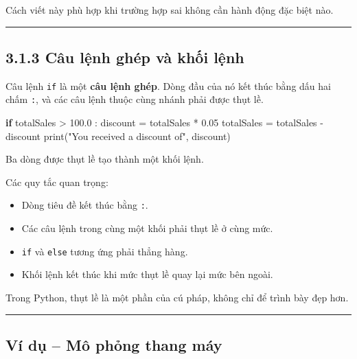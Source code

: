 \documentclass[
  11pt,
  a4paper,
]{article}
\newenvironment{Shaded}{}{}
\newcommand{\BuiltInTok}[1]{\textcolor[rgb]{0.00,0.50,0.00}{#1}}
\newcommand{\ControlFlowTok}[1]{\textcolor[rgb]{0.00,0.44,0.13}{\textbf{#1}}}
\newcommand{\FloatTok}[1]{\textcolor[rgb]{0.25,0.63,0.44}{#1}}
\newcommand{\NormalTok}[1]{#1}
\newcommand{\OperatorTok}[1]{\textcolor[rgb]{0.40,0.40,0.40}{#1}}
\newcommand{\StringTok}[1]{\textcolor[rgb]{0.25,0.44,0.63}{#1}}
\providecommand{\tightlist}{%
  \setlength{\itemsep}{0pt}\setlength{\parskip}{0pt}}
\begin{document}
Cách viết này phù hợp khi trường hợp sai không cần hành động đặc biệt
nào.

\begin{center}\rule{0.5\linewidth}{0.5pt}\end{center}

\subsection{3.1.3 Câu lệnh ghép và khối
lệnh}\label{cuxe2u-lux1ec7nh-ghuxe9p-vuxe0-khux1ed1i-lux1ec7nh}

Câu lệnh \texttt{if} là một \textbf{câu lệnh ghép}. Dòng đầu của nó kết
thúc bằng dấu hai chấm \texttt{:}, và các câu lệnh thuộc cùng nhánh phải
được thụt lề.

\begin{Shaded}
\begin{Highlighting}[]
\ControlFlowTok{if}\NormalTok{ totalSales }\OperatorTok{\textgreater{}} \FloatTok{100.0}\NormalTok{ :}
\NormalTok{    discount }\OperatorTok{=}\NormalTok{ totalSales }\OperatorTok{*} \FloatTok{0.05}
\NormalTok{    totalSales }\OperatorTok{=}\NormalTok{ totalSales }\OperatorTok{{-}}\NormalTok{ discount}
    \BuiltInTok{print}\NormalTok{(}\StringTok{"You received a discount of"}\NormalTok{, discount)}
\end{Highlighting}
\end{Shaded}

Ba dòng được thụt lề tạo thành một khối lệnh.

Các quy tắc quan trọng:

\begin{itemize}
\tightlist
\item
  Dòng tiêu đề kết thúc bằng \texttt{:}.
\item
  Các câu lệnh trong cùng một khối phải thụt lề ở cùng mức.
\item
  \texttt{if} và \texttt{else} tương ứng phải thẳng hàng.
\item
  Khối lệnh kết thúc khi mức thụt lề quay lại mức bên ngoài.
\end{itemize}

Trong Python, thụt lề là một phần của cú pháp, không chỉ để trình bày
đẹp hơn.

\begin{center}\rule{0.5\linewidth}{0.5pt}\end{center}

\subsection{Ví dụ -- Mô phỏng thang
máy}\label{vuxed-dux1ee5-muxf4-phux1ecfng-thang-muxe1y}
\end{document}
